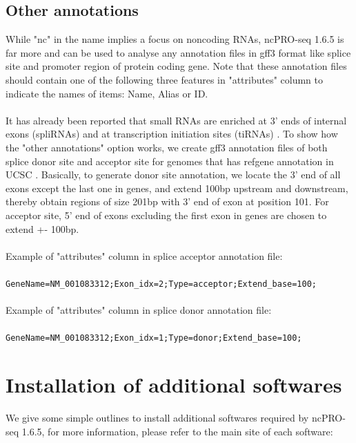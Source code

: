 \documentclass[12pt]{article}
\def \ncpip{ncPRO-seq 1.6.5}
\begin{document}
\subsection{Other annotations}

While "nc" in the name implies a focus on noncoding RNAs, \ncpip{} is far more and can be used to analyse any annotation files in gff3 format like splice site and promoter region of protein coding gene. Note that these annotation files should contain one of the following three features in "attributes" column to indicate the names of items: Name, Alias or ID. \\\\
It has already been reported that small RNAs are enriched at 3' ends of internal exons (spliRNAs) and at transcription initiation sites (tiRNAs) \cite{Taft2010}. To show how the "other annotations" option works, we create gff3 annotation files of both splice donor site and acceptor site for genomes that has refgene annotation in UCSC \cite{Dreszer2012}. Basically, to generate donor site annotation, we locate the 3' end of all exons except the last one in genes, and extend 100bp upstream and downstream, thereby obtain regions of size 201bp with 3' end of exon at position 101. For acceptor site, 5' end of exons excluding the first exon in genes are chosen to extend +- 100bp. \\\\
Example of "attributes" column in splice acceptor annotation file:\\\\
\verb|GeneName=NM_001083312;Exon_idx=2;Type=acceptor;Extend_base=100;|\\\\
Example of "attributes" column in splice donor annotation file:\\\\
\verb|GeneName=NM_001083312;Exon_idx=1;Type=donor;Extend_base=100;|

\section{Installation of additional softwares}
\label{subsection:additional}

We give some simple outlines to install additional softwares required by \ncpip{}, for more information, please refer to the main site of each software:
\end{document}
